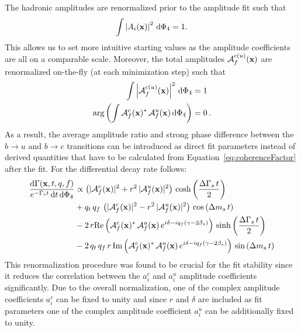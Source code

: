 The hadronic amplitudes are renormalized prior to the amplitude fit such that 
\begin{equation}
	\int  \left\vert   A_{i}(\mathbf{x}) \right\vert^{2} \, \mathrm{d}\Phi_4= 1 .
\end{equation}
This allows us to set more intuitive starting values as the amplitude coefficients are all on a comparable scale.
Moreover, the total amplitudes $\mathcal A^{c(u)}_{f}(\mathbf{x})$ are renormalized on-the-fly (\ie at each minimization step) such that
\begin{align}
	\nonumber 
	\int  \left\vert  \mathcal A^{c(u)}_{f}(\mathbf{x}) \right\vert^{2} \, \mathrm{d}\Phi_4  & = 1  \\
	\text{arg}\left( \int \mathcal A^{c}_{f}(\mathbf{x})^* \, \mathcal A^{u}_{f}(\mathbf{x}) \, \mathrm{d}\Phi_4 \right) & = 0    \,.
\end{align}
As a result, the average amplitude ratio and strong phase difference between the $b\to u$ and $b\to c$ transitions can be introduced as direct fit parameters 
instead of derived quantities that have to be calculated from Equation~\ref{eq:coherenceFactor}
after the fit.
For the differential decay rate follows:
\begin{equation}
\begin{split}
\label{eq:PDF_full2}
	\frac{\text{d}\Gamma(\mathbf{x},t,q,f)}{ e^{- \Gamma_s t} \, \text{d}t \, \text{d}\Phi_4} &\propto  
	 \left( \vert \mathcal A^c_{f}(\mathbf{x}) \vert^2 + r^2 \, \vert \mathcal A^u_{f}(\mathbf{x}) \vert^2 \right) \, \text{cosh} \left( \frac{\Delta \Gamma_s \, t}{2}\right) \\
	 & + q_t \, q_f \,  \left( \vert \mathcal A^c_{f}(\mathbf{x}) \vert^2 - r^2 \, \vert \mathcal A^u_{f}(\mathbf{x})  \vert^2 \right) \, \text{cos} \left(\Delta m_s \, t \right)  \\
	 & -2 \, r \text{Re}\left( \mathcal A^c_{f}(\mathbf{x})^{*}  \, \mathcal A^u_{f}(\mathbf{x})  \, e^{i \delta - i q_f (\gamma - 2\beta_s)}  \right) \, \text{sinh} \left( \frac{\Delta \Gamma_s \, t}{2}\right)  \\
	 & -2 \, q_t \, q_f \, r \,  \text{Im}\left( \mathcal A^c_{f}(\mathbf{x})^{*} \, \mathcal A^u_{f}(\mathbf{x})  \, e^{i \delta -i q_f (\gamma - 2\beta_s)}  \right)\, \text{sin} \left(\Delta m_s \, t \right)  
\end{split}
\end{equation}
This renormalization procedure was found to be crucial for the fit stability since it reduces the correlation between the $a_i^c$ and $a_i^u$ amplitude coefficients significantly.
Due to the overall normalization, one of the complex amplitude coefficients $a_i^c$ can be fixed to unity 
and since $r$ and $\delta$ are included as fit parameters one of the complex amplitude coefficient $a_i^u$ can be additionally fixed to unity.

